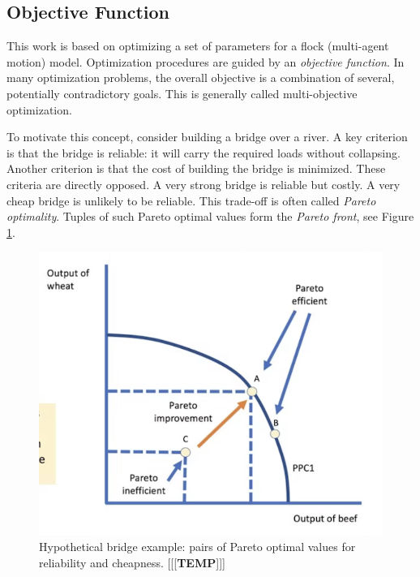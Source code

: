 \documentclass[letterpaper]{article}
\begin{document}
\subsection{Objective Function}
\label{subsec:Objective_Function}

This work is based on optimizing a set of parameters for a flock (multi-agent motion) model. Optimization procedures are guided by an \textit{objective function}. In many optimization problems, the overall objective is a combination of several, potentially contradictory goals. This is generally called multi-objective optimization. 
\par

To motivate this concept, consider building a bridge over a river. A key criterion is that the bridge is reliable: it will carry the required loads without collapsing. Another criterion is that the cost of building the bridge is minimized. These criteria are directly opposed. A very strong bridge is reliable but costly. A very cheap bridge is unlikely to be reliable. This trade-off is often called \textit{Pareto optimality}. Tuples of such Pareto optimal values form the \textit{Pareto front}, see Figure \ref{fig:Pareto-front}.
\par

\begin{figure}[]
    \includegraphics[width=\columnwidth]{images/temp_MOF.png}
    \caption{Hypothetical bridge example: pairs of Pareto optimal values for reliability and cheapness. [[[\textbf{TEMP}]]]}
    \label{fig:Pareto-front}
\end{figure}
\end{document}
